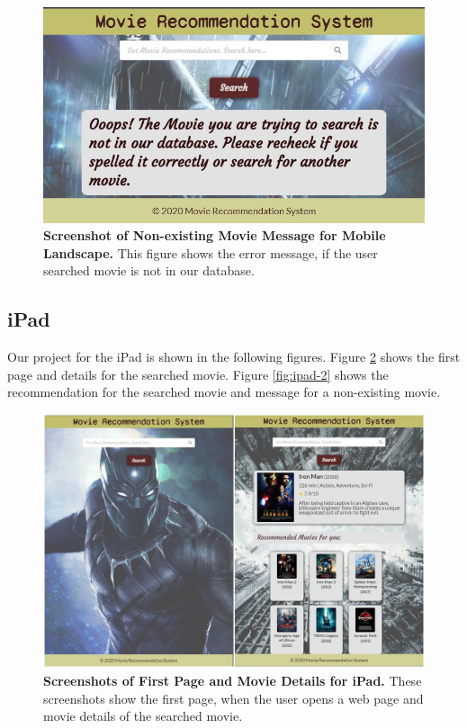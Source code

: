 \begin{figure}[ht]
	\centering
  	\includegraphics[width=1.0\textwidth]{images/mobile_l_error.JPG}
	\caption{\textbf{Screenshot of Non-existing Movie Message for Mobile Landscape.} This figure shows the error message, if the user searched movie is not in our database.}
  	\label{fig:mobile-l-error}
\end{figure}


\subsection{iPad}

Our project for the iPad is shown in the following figures. Figure \ref{fig:ipad-1} shows the first page and details for the searched movie. Figure \ref{fig:ipad-2} shows the recommendation for the searched movie and message for a non-existing movie.

\begin{figure}[ht]
	\centering
  	\includegraphics[width=1.0\textwidth]{images/iPad_1.JPG}
	\caption{\textbf{Screenshots of First Page and Movie Details for iPad.} These screenshots show the first page, when the user opens a web page and movie details of the searched movie.}
  	\label{fig:ipad-1}
\end{figure}

